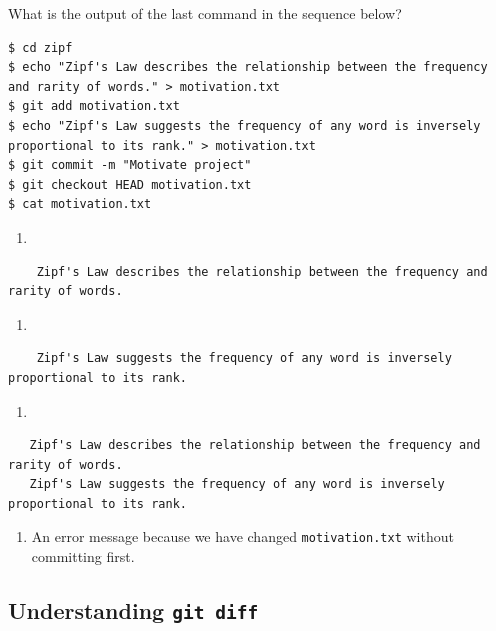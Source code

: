 \documentclass[
]{krantz}
\providecommand{\tightlist}{%
  \setlength{\itemsep}{0pt}\setlength{\parskip}{0pt}}
\begin{document}
What is the output of the last command in the sequence below?

\begin{verbatim}
$ cd zipf
$ echo "Zipf's Law describes the relationship between the frequency and rarity of words." > motivation.txt
$ git add motivation.txt
$ echo "Zipf's Law suggests the frequency of any word is inversely proportional to its rank." > motivation.txt
$ git commit -m "Motivate project"
$ git checkout HEAD motivation.txt
$ cat motivation.txt
\end{verbatim}

\begin{enumerate}
\def\labelenumi{\arabic{enumi}.}
\tightlist
\item
\end{enumerate}

\begin{verbatim}
    Zipf's Law describes the relationship between the frequency and rarity of words.
\end{verbatim}

\begin{enumerate}
\def\labelenumi{\arabic{enumi}.}
\setcounter{enumi}{1}
\tightlist
\item
\end{enumerate}

\begin{verbatim}
    Zipf's Law suggests the frequency of any word is inversely proportional to its rank.
\end{verbatim}

\begin{enumerate}
\def\labelenumi{\arabic{enumi}.}
\setcounter{enumi}{2}
\tightlist
\item
\end{enumerate}

\begin{verbatim}
   Zipf's Law describes the relationship between the frequency and rarity of words.
   Zipf's Law suggests the frequency of any word is inversely proportional to its rank.
\end{verbatim}

\begin{enumerate}
\def\labelenumi{\arabic{enumi}.}
\setcounter{enumi}{3}
\tightlist
\item
  An error message because we have changed \texttt{motivation.txt} without committing first.
\end{enumerate}

\hypertarget{git-cmdline-ex-diff}{%
\subsection{\texorpdfstring{Understanding \texttt{git\ diff}}{Understanding git diff}}\label{git-cmdline-ex-diff}}
\end{document}
